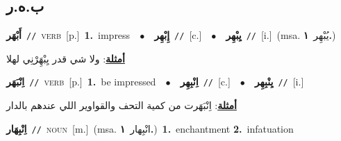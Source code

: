 \documentclass[10pt,a4paper,twoside]{article} %
\begin{document}
\begin{multicols}{2}
\vspace{-3mm}
\subsection*{\color{blue}\foreignlanguage{arabic}{ب.ه.ر}\color{blue}{}} 

{\setlength\topsep{0pt}\textbf{\foreignlanguage{arabic}{أَبْهَر}}\ {\color{gray}\texttt{//}\color{black}}\ \textsc{verb}\ [p.]\ \textbf{1.}~impress\ \ $\bullet$\ \ \setlength\topsep{0pt}\textbf{\foreignlanguage{arabic}{إِبْهِر}}\ {\color{gray}\texttt{//}\color{black}}\ [c.]\ \ $\bullet$\ \ \setlength\topsep{0pt}\textbf{\foreignlanguage{arabic}{يِبْهِر}}\ {\color{gray}\texttt{//}\color{black}}\ [i.]\ \color{gray}(msa. \foreignlanguage{arabic}{يُبْهِر}~\foreignlanguage{arabic}{\textbf{١.}})\color{black}\  \begin{flushright}\color{gray}\foreignlanguage{arabic}{\textbf{\underline{\foreignlanguage{arabic}{أمثلة}}}: ولا شي قدر يِبْهَِرْنِي لهلا}\end{flushright}\color{black}} \vspace{2mm}

{\setlength\topsep{0pt}\textbf{\foreignlanguage{arabic}{اِنْبَهَر}}\ {\color{gray}\texttt{//}\color{black}}\ \textsc{verb}\ [p.]\ \textbf{1.}~be impressed\ \ $\bullet$\ \ \setlength\topsep{0pt}\textbf{\foreignlanguage{arabic}{اِنْبِهِر}}\ {\color{gray}\texttt{//}\color{black}}\ [c.]\ \ $\bullet$\ \ \setlength\topsep{0pt}\textbf{\foreignlanguage{arabic}{يِنْبِهِر}}\ {\color{gray}\texttt{//}\color{black}}\ [i.]\  \begin{flushright}\color{gray}\foreignlanguage{arabic}{\textbf{\underline{\foreignlanguage{arabic}{أمثلة}}}: اِنْبَهَرت من كمية التحف والقواوير اللي عندهم بالدار}\end{flushright}\color{black}} \vspace{2mm}

{\setlength\topsep{0pt}\textbf{\foreignlanguage{arabic}{اِنْبِهَار}}\ {\color{gray}\texttt{//}\color{black}}\ \textsc{noun}\ [m.]\ \color{gray}(msa. \foreignlanguage{arabic}{انْبِهار}~\foreignlanguage{arabic}{\textbf{١.}})\color{black}\ \textbf{1.}~enchantment  \textbf{2.}~infatuation\ } \vspace{2mm}


\end{multicols}
\end{document}
